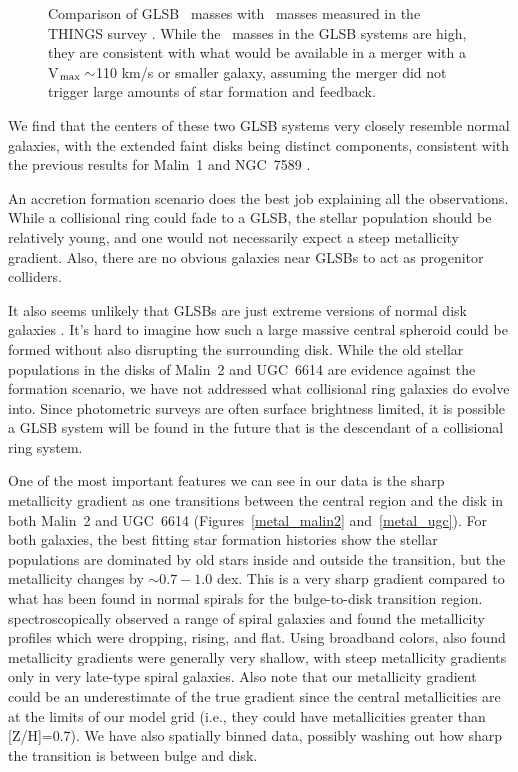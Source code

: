 \documentclass{emulateapj}
\newcommand\HI{\ion{H}{1}}
\begin{document}
\begin{figure*}
\caption{Comparison of GLSB \HI\ masses \citep{Pickering97} with \HI\ masses measured in the THINGS survey \citep{Walter2008}.  While the \HI\ masses in the GLSB systems are high, they are consistent with what would be available in a merger with a V$_{\rm{max}}\sim$110 km/s or smaller galaxy, assuming the merger did not trigger large amounts of star formation and feedback. \label{thingsMHI}}
\end{figure*}


We find that the centers of these two GLSB systems very closely resemble normal galaxies, with the extended faint disks being distinct components, consistent with the previous results for Malin~1 \citep{Barth07} and NGC~7589 \citep{Lelli10}. 

An accretion formation scenario does the best job explaining all the observations.  While a collisional ring could fade to a GLSB, the stellar population should be relatively young, and one would not necessarily expect a steep metallicity gradient.  Also, there are no obvious galaxies near GLSBs to act as progenitor colliders.  

It also seems unlikely that GLSBs are just extreme versions of normal disk galaxies \citep{Das13}.  It's hard to imagine how such a large massive central spheroid could be formed without also disrupting the surrounding disk.  While the old stellar populations in the disks of Malin~2 and UGC~6614 are evidence against the \citet{Mapelli08} formation scenario, we have not addressed what collisional ring galaxies do evolve into.  Since photometric surveys are often surface brightness limited, it is possible a GLSB system will be found in the future that is the descendant of a collisional ring system.  

One of the most important features we can see in our data is the sharp metallicity gradient as one transitions between the central region and the disk in both Malin~2 and UGC~6614 (Figures~\ref{metal_malin2} and~\ref{metal_ugc}).  For both galaxies, the best fitting star formation histories show the stellar populations are dominated by old stars inside and outside the transition, but the metallicity changes by $\sim0.7-1.0$ dex.  This is a very sharp gradient compared to what has been found in normal spirals for the bulge-to-disk transition region.  \citet{MacArthur09} spectroscopically observed a range of spiral galaxies and found the metallicity profiles which were dropping, rising, and flat.  Using broadband colors, \citet{MacArthur04} also found metallicity gradients were generally very shallow, with steep metallicity gradients only in very late-type spiral galaxies. Also note that our metallicity gradient could be an underestimate of the true gradient since the central metallicities are at the limits of our model grid (i.e., they could have metallicities greater than [Z/H]=0.7). We have also spatially binned data, possibly washing out how sharp the transition is between bulge and disk.
\end{document}
